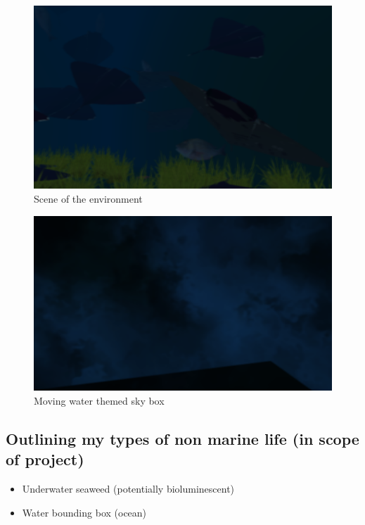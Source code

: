 \documentclass[a4paper, 10pt]{article}
\begin{document}
\begin{figure}[h!]
    \centering
    \includegraphics[scale=0.125]{images/scene.png}
    \caption{Scene of the environment}
    \label{fig:environment}
\end{figure}

\begin{figure}[h!]
    \centering
    \includegraphics[scale=0.1]{images/skybox.png}
    \caption{Moving water themed sky box}
    \label{fig:environment}
\end{figure}

\newpage

\subsection{Outlining my types of non marine life (in scope of project)}
\begin{itemize}
    \item Underwater seaweed (potentially bioluminescent)
    \item Water bounding box (ocean)
\end{itemize}
\end{document}
